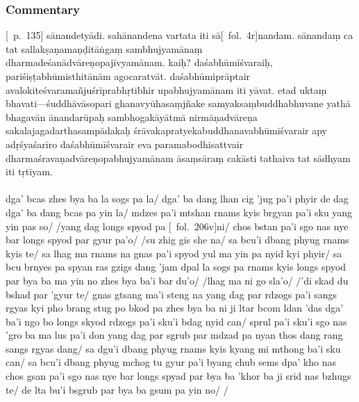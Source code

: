 \documentclass[12pt]{article}
\newcommand{\emdash} {\hspace{0em}—\hspace{0em}}
\begin{document}
\subsubsection{Commentary}
[\EDD\ p.\ 135] sānandetyādi.
sahānandena vartata iti sā[\MS\ fol.\ 4r]nandam.
sānandaṃ ca tat sallakṣaṇamaṇḍitāṅgaṃ sambhujyamānaṃ dharmadeśanādvāreṇopajīvyamānam.\footnoteB{
	°opajīvyamānam] \MS\ \EDD; °opabhujyamānam \possibleemd\ (\emph{cf.} \TVA\ and \TVB: nye bar longs spyod par gyur pa'o)
}
kaiḥ?
daśabhūmīśvaraiḥ, pariśiṣṭabhūmisthitānām\footnoteB{
	pariṣiṣṭabhūmi°] \corr; pariṣiṣṭa bhumi° \EDD
} agocaratvāt.
daśabhūmiprāptair avalokiteśvaramañjuśrīprabhṛtibhir upabhujyamānam iti yāvat.
etad uktaṃ bhavati\emdash śuddhāvāsopari ghanavyūhasaṃjñake\footnoteB{
	°saṃjñake] \emd; °saṃjñako \MS; °saṃjñakaḥ \EDD\ (\emd)
} samyaksaṃbuddhabhuvane yathā bhagavān ānandarūpaḥ sambhogakāyātmā nirmāṇadvāreṇa sakalajagadarthasampādakaḥ śrāvakapratyekabuddhanavabhūmīśvarair apy adṛśyaśarīro daśabhūmīśvarair eva paramabodhisattvair\footnoteB{
	paramabodhisattvair] \conj\ (\emph{cf.}\ \TVA\ and \TVB: mchog tu gyur pa'i byang chub sems dpa'); paraṃ bodhisatvair \MS\ \EDD\ (°sattvair)
} dharmaśravaṇadvāreṇopabhujyamānam āsaṃsāraṃ cakāsti tathaiva tat sādhyam iti tṛtīyam.\\

\textbf{\TVA}\\
dga' bcas zhes bya ba la sogs pa la/ dga' ba dang lhan cig 'jug pa'i phyir de dag dga' ba dang bcas pa yin la/ mdzes pa'i mtshan rnams kyis brgyan pa'i sku yang yin pas so/ /yang dag longs spyod pa [\TVA\ fol.\ 206v]ni/ chos bstan pa'i sgo nas nye bar longs spyod par gyur pa'o/ /su zhig gis she na/ sa bcu'i dbang phyug rnams kyis te/ sa lhag ma rnams na gnas pa'i spyod yul ma yin pa nyid kyi phyir/ sa bcu brnyes pa spyan ras gzigs dang 'jam dpal la sogs pa rnams kyis longs spyod par bya ba ma yin no zhes bya ba'i bar du'o/ /lhag ma ni go sla'o/ /'di skad du bshad par 'gyur te/ gnas gtsang ma'i steng na yang dag par rdzogs pa'i sangs rgyas kyi pho brang stug po bkod pa zhes bya ba ni ji ltar bcom ldan 'das dga' ba'i ngo bo longs skyod rdzogs pa'i sku'i bdag nyid can/ sprul pa'i sku'i sgo nas 'gro ba ma lus pa'i don yang dag par sgrub par mdzad pa nyan thos dang rang sangs rgyas dang/ sa dgu'i dbang phyug rnams kyis kyang mi mthong ba'i sku can/ sa bcu'i dbang phyug mchog tu gyur pa'i byang chub sems dpa' kho nas chos gsan pa'i sgo nas nye bar longs spyad par bya ba 'khor ba ji srid nas bzhugs te/ de lta bu'i bsgrub par bya ba gsum pa yin no/ /\\
\end{document}
